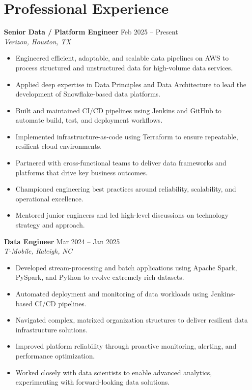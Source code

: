 \documentclass[10pt]{article} %
\begin{document}
\section*{Professional Experience}

\textbf{Senior Data / Platform Engineer} \hfill Feb 2025 -- Present \\
\textit{Verizon, Houston, TX}
\begin{itemize}[leftmargin=*, itemsep=3pt]
    \item Engineered efficient, adaptable, and scalable data pipelines on AWS to process structured and unstructured data for high-volume data services. %
    \item Applied deep expertise in Data Principles and Data Architecture to lead the development of Snowflake-based data platforms. %
    \item Built and maintained CI/CD pipelines using Jenkins and GitHub to automate build, test, and deployment workflows. %
    \item Implemented infrastructure-as-code using Terraform to ensure repeatable, resilient cloud environments. %
    \item Partnered with cross-functional teams to deliver data frameworks and platforms that drive key business outcomes. %
    \item Championed engineering best practices around reliability, scalability, and operational excellence. %
    \item Mentored junior engineers and led high-level discussions on technology strategy and approach. %
\end{itemize}

\textbf{Data Engineer} \hfill Mar 2024 -- Jan 2025 \\
\textit{T-Mobile, Raleigh, NC}
\begin{itemize}[leftmargin=*, itemsep=3pt]
    \item Developed stream-processing and batch applications using Apache Spark, PySpark, and Python to evolve extremely rich datasets. %
    \item Automated deployment and monitoring of data workloads using Jenkins-based CI/CD pipelines. %
    \item Navigated complex, matrixed organization structures to deliver resilient data infrastructure solutions. %
    \item Improved platform reliability through proactive monitoring, alerting, and performance optimization. %
    \item Worked closely with data scientists to enable advanced analytics, experimenting with forward-looking data solutions. %
\end{itemize}
\end{document}
